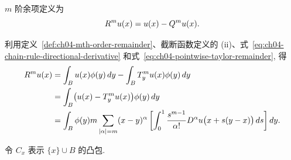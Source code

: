 \setcounter{thmcount}{5}
\begin{Definition}
\label{def:ch04-mth-order-remainder}
$m$ 阶余项定义为
\[
\MathBookFormulaID{formula-ch04-mth-order-remainder-definition}
R^m u(x)=u(x)-Q^m u(x).
\]
\end{Definition}

利用定义~\ref{def:ch04-mth-order-remainder}、截断函数定义的 (ii)、式~\eqref{eq:ch04-chain-rule-directional-derivative} 和式~\eqref{eq:ch04-pointwise-taylor-remainder}, 得
\begin{equation}
\MathBookFormulaID{formula-ch04-averaged-remainder-integral}
\label{eq:ch04-averaged-remainder-integral}
\begin{aligned}
R^m u(x)
&=\int_Bu(x)\phi(y)\,dy-\int_BT_y^m u(x)\phi(y)\,dy\\
&=\int_B\bigl(u(x)-T_y^m u(x)\bigr)\phi(y)\,dy\\
&=\int_B\phi(y)m\sum_{|\alpha|=m}(x-y)^\alpha
\left[\int_0^1\frac{s^{m-1}}{\alpha!}D^\alpha u\bigl(x+s(y-x)\bigr)\,ds\right]dy.
\end{aligned}
\end{equation}

令 $C_x$ 表示 $\{x\}\cup B$ 的凸包.

